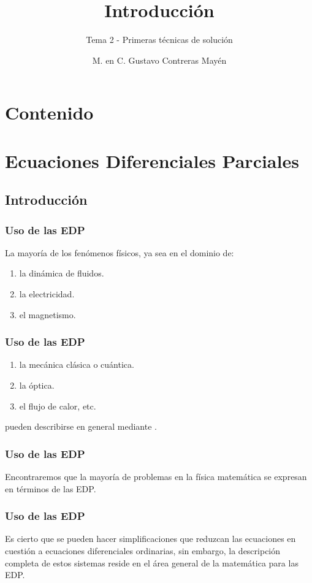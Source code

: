 \documentclass[12pt]{beamer}
\title{\large{Introducción}}
\subtitle{Tema 2 - Primeras técnicas de solución}
\author{M. en C. Gustavo Contreras Mayén}
\date{}
\begin{document}
\maketitle
\fontsize{14}{14}\selectfont
{}

\section*{Contenido}

\section{Ecuaciones Diferenciales Parciales}
\subsection{Introducción}

\begin{frame}
\frametitle{Uso de las EDP}
La mayoría de los fenómenos físicos, ya sea en el dominio de:
\pause
{}
\begin{enumerate}[<+->]
\item la dinámica de fluidos.
\item la electricidad.
\item el magnetismo.
\seti
\end{enumerate}
\end{frame}
\begin{frame}
\frametitle{Uso de las EDP}
\begin{enumerate}[<+->]
\conti
\item la mecánica clásica o cuántica.
\item la óptica.
\item el flujo de calor, etc.
\end{enumerate}
\pause
pueden describirse en general mediante .
\end{frame}
\begin{frame}
\frametitle{Uso de las EDP}
Encontraremos que la mayoría de problemas en la física matemática se expresan en términos de las EDP.
\end{frame}
\begin{frame}
\frametitle{Uso de las EDP}
Es cierto que se pueden hacer simplificaciones que reduzcan las ecuaciones en cuestión a ecuaciones diferenciales ordinarias, sin embargo, la descripción completa de estos sistemas reside en el área general de la matemática para las EDP.
\end{frame}
\end{document}
